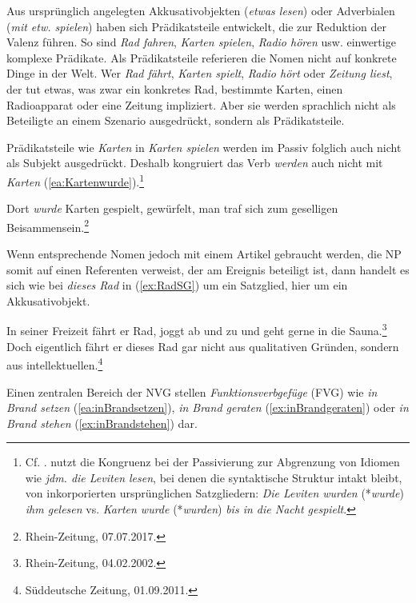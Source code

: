 Aus ursprünglich angelegten Akkusativobjekten (\textit{etwas lesen}) oder Adverbialen (\textit{mit etw. spielen}) haben sich Prädikatsteile entwickelt, die zur Reduktion der Valenz führen. So sind \textit{Rad fahren}, \textit{Karten spielen}, \textit{Radio hören} usw. einwertige komplexe Prädikate. Als Prädikatsteile referieren die Nomen nicht auf konkrete Dinge in der Welt. Wer \textit{Rad fährt}, \textit{Karten spielt}, \textit{Radio hört} oder \textit{Zeitung liest}, der tut etwas, was zwar ein konkretes Rad, bestimmte Karten, einen Radioapparat oder eine Zeitung impliziert. Aber sie werden sprachlich nicht als Beteiligte an einem Szenario ausgedrückt, sondern als Prädikatsteile.

Prädikatsteile wie \textit{Karten} in \textit{Karten spielen} werden im Passiv folglich auch nicht als Subjekt ausgedrückt. Deshalb kongruiert das Verb \textit{werden} auch nicht mit \textit{Karten} (\ref{ea:Kartenwurde}).\footnote{Cf. \citet[295]{KrochSantorini1991}. \citet[382]{Mueller1999} nutzt die Kongruenz bei der Passivierung zur Abgrenzung von Idiomen wie \textit{jdm. die Leviten lesen}, bei denen die syntaktische Struktur intakt bleibt, von inkorporierten ursprünglichen Satzgliedern: \textit{Die Leviten wurden} (*\textit{wurde}) \textit{ihm gelesen} vs. \textit{Karten wurde} (*\textit{wurden}) \textit{bis in die Nacht gespielt}.}   

\ea \label{ea:Kartenwurde} Dort \textit{wurde} Karten gespielt, gewürfelt, man traf sich zum geselligen Beisammensein.\footnote{Rhein-Zeitung, 07.07.2017.}
\z 

Wenn entsprechende Nomen jedoch mit einem Artikel gebraucht werden, die NP somit auf einen Referenten verweist, der am Ereignis beteiligt ist, dann handelt es sich wie bei \textit{dieses Rad} in (\ref{ex:RadSG}) um ein Satzglied, hier um ein Akkusativobjekt. 

\ea \label{ea:PToderSG}
\ea \label{ea:RadPT} In seiner Freizeit fährt er Rad, joggt ab und zu und geht gerne in die Sauna.\footnote{Rhein-Zeitung, 04.02.2002.} 
\ex \label{ex:RadSG} Doch eigentlich fährt er dieses Rad gar nicht aus qualitativen Gründen, sondern aus intellektuellen.\footnote{Süddeutsche Zeitung, 01.09.2011.}
\z 
\z 

Einen zentralen Bereich der NVG stellen \textit{Funktionsverbgefüge} (FVG) wie \textit{in Brand setzen} (\ref{ea:inBrandsetzen}), \textit{in Brand geraten} (\ref{ex:inBrandgeraten}) oder \textit{in Brand stehen} (\ref{ex:inBrandstehen}) dar.  


